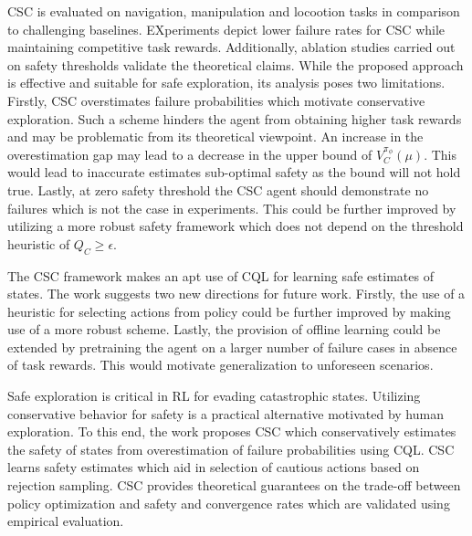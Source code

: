\documentclass[11pt,letterpaper]{article}
\begin{document}
CSC is evaluated on navigation, manipulation and locootion tasks in comparison to challenging baselines. EXperiments depict lower failure rates for CSC while maintaining competitive task rewards. Additionally, ablation studies carried out on safety thresholds validate the theoretical claims. While the proposed approach is effective and suitable for safe exploration, its analysis poses two limitations. Firstly, CSC overstimates failure probabilities which motivate conservative exploration. Such a scheme hinders the agent from obtaining higher task rewards and may be problematic from its theoretical viewpoint. An increase in the overestimation gap may lead to a decrease in the upper bound of $V_{C}^{\pi_{\phi}}(\mu)$. This would lead to inaccurate estimates sub-optimal safety as the bound will not hold true. Lastly, at zero safety threshold the CSC agent should demonstrate no failures which is not the case in experiments. This could be further improved by utilizing a more robust safety framework which does not depend on the threshold heuristic of $Q_{C} \geq \epsilon$. 

The CSC framework makes an apt use of CQL for learning safe estimates of states. The work suggests two new directions for future work. Firstly, the use of a heuristic for selecting actions from policy could be further improved by making use of a more robust scheme. Lastly, the provision of offline learning could be extended by pretraining the agent on a larger number of failure cases in absence of task rewards. This would motivate generalization to unforeseen scenarios. 

Safe exploration is critical in RL for evading catastrophic states. Utilizing conservative behavior for safety is a practical alternative motivated by human exploration. To this end, the work proposes CSC which conservatively estimates the safety of states from overestimation of failure probabilities using CQL. CSC learns safety estimates which aid in selection of cautious actions based on rejection sampling. CSC provides theoretical guarantees on the trade-off between policy optimization and safety and convergence rates which are validated using empirical evaluation. 
\end{document}
